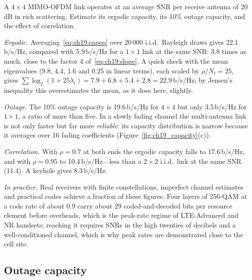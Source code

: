 \begin{worked}
A $4\times4$ MIMO-OFDM link operates at an average SNR per receive antenna of 20\,dB in rich
scattering. Estimate its ergodic capacity, its 10\% outage capacity, and the effect of
correlation.

\emph{Ergodic.} Averaging~\eqref{eq:ch19:capeq} over 20\,000 i.i.d.\ Rayleigh draws gives
22.1\,b/s/Hz, compared with 5.9\,b/s/Hz for a $1\times1$ link at the same SNR: 3.8 times as much,
close to the factor 4 of~\eqref{eq:ch19:slope}. A quick check with the mean eigenvalues
(9.8, 4.4, 1.6 and 0.25 in linear terms), each scaled by $\rho/N_t=25$, gives
$\sum\log_2(1+25\lambda_i)=7.9+6.8+5.4+2.8=22.9$\,b/s/Hz; by Jensen's inequality this
overestimates the mean, as it does here, slightly.

\emph{Outage.} The 10\% outage capacity is 19.6\,b/s/Hz for $4\times4$ but only 3.5\,b/s/Hz for
$1\times1$, a ratio of more than five. In a slowly fading channel the multi-antenna link is
not only faster but far more \emph{reliable}: its capacity distribution is narrow because it
averages over 16 fading coefficients (Figure~\ref{fig:ch19_capacity}(c)).

\emph{Correlation.} With $\rho=0.7$ at both ends the ergodic capacity falls to 17.6\,b/s/Hz, and with
$\rho=0.95$ to 10.4\,b/s/Hz---less than a $2\times2$ i.i.d.\ link at the same SNR (11.4). A keyhole
gives 8.3\,b/s/Hz.

\emph{In practice.} Real receivers with finite constellations, imperfect channel estimates and
practical codes achieve a fraction of these figures. Four layers of 256-QAM at a code rate of about
0.9 carry about 29 coded-and-decoded bits per resource element before overheads, which is the
peak-rate regime of LTE-Advanced and NR handsets; reaching it requires SNRs in the high twenties
of decibels and a well-conditioned channel, which is why peak rates are demonstrated close to the
cell site.
\end{worked}

\subsection{Outage capacity}


